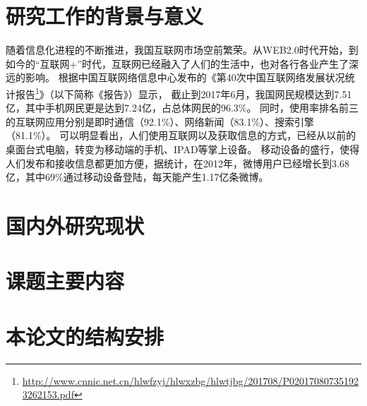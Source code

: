 \thesischapterexordium
\section{研究工作的背景与意义}
随着信息化进程的不断推进，我国互联网市场空前繁荣。从WEB2.0时代开始，到如今的“互联网+”时代，互联网已经融入了人们的生活中，也对各行各业产生了深远的影响。
根据中国互联网络信息中心发布的《第40次中国互联网络发展状况统计报告\footnote{\url{http://www.cnnic.net.cn/hlwfzyj/hlwxzbg/hlwtjbg/201708/P020170807351923262153.pdf}}》（以下简称《报告》）显示，
截止到2017年6月，我国网民规模达到7.51亿，其中手机网民更是达到7.24亿，占总体网民的96.3\%。
同时，使用率排名前三的互联网应用分别是即时通信（92.1\%）、网络新闻（83.1\%）、搜索引擎（81.1\%）。
可以明显看出，人们使用互联网以及获取信息的方式，已经从以前的桌面台式电脑，转变为移动端的手机、IPAD等掌上设备。
移动设备的盛行，使得人们发布和接收信息都更加方便，据统计，在2012年，微博用户已经增长到3.68亿，其中69\%通过移动设备登陆，每天能产生1.17亿条微博。

\section{国内外研究现状}
\section{课题主要内容}
\section{本论文的结构安排}
